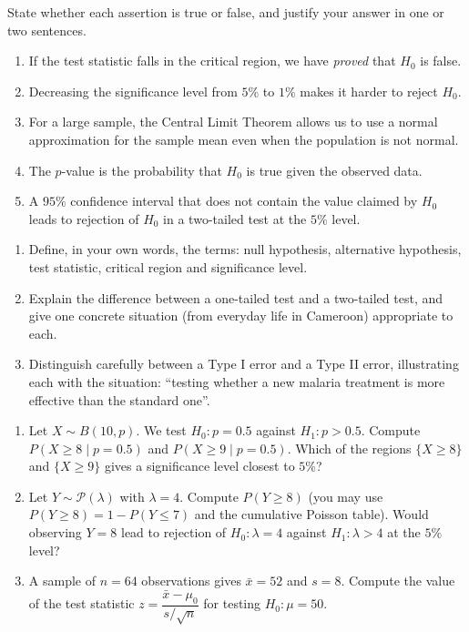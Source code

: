 \documentclass[11pt]{article}
\newcommand{\cle}[1]{{\popxbold\color{popdark}#1}}
\begin{document}
\begin{exercice}
State whether each assertion is true or false, and justify your answer in one or two sentences.
\begin{enumerate}
\item If the test statistic falls in the critical region, we have \emph{proved} that $H_0$ is false.
\item Decreasing the significance level from $5\%$ to $1\%$ makes it harder to reject $H_0$.
\item For a large sample, the Central Limit Theorem allows us to use a normal approximation for the sample mean even when the population is not normal.
\item The $p$-value is the probability that $H_0$ is true given the observed data.
\item A $95\%$ confidence interval that does not contain the value claimed by $H_0$ leads to rejection of $H_0$ in a two-tailed test at the $5\%$ level.
\end{enumerate}
\end{exercice}

\begin{exercice}
\begin{enumerate}
\item Define, in your own words, the terms: \cle{null hypothesis}, \cle{alternative hypothesis}, \cle{test statistic}, \cle{critical region} and \cle{significance level}.
\item Explain the difference between a \cle{one-tailed} test and a \cle{two-tailed} test, and give one concrete situation (from everyday life in Cameroon) appropriate to each.
\item Distinguish carefully between a Type I error and a Type II error, illustrating each with the situation: ``testing whether a new malaria treatment is more effective than the standard one''.
\end{enumerate}
\end{exercice}

\begin{exercice}
\begin{enumerate}
\item Let $X \sim B(10, p)$. We test $H_0: p = 0.5$ against $H_1: p > 0.5$. Compute $P(X \geq 8 \mid p = 0.5)$ and $P(X \geq 9 \mid p = 0.5)$. Which of the regions $\{X \geq 8\}$ and $\{X \geq 9\}$ gives a significance level closest to $5\%$?
\item Let $Y \sim \mathcal{P}(\lambda)$ with $\lambda = 4$. Compute $P(Y \geq 8)$ (you may use $P(Y \geq 8) = 1 - P(Y \leq 7)$ and the cumulative Poisson table). Would observing $Y = 8$ lead to rejection of $H_0: \lambda = 4$ against $H_1: \lambda > 4$ at the $5\%$ level?
\item A sample of $n = 64$ observations gives $\bar{x} = 52$ and $s = 8$. Compute the value of the test statistic $z = \dfrac{\bar{x} - \mu_0}{s/\sqrt{n}}$ for testing $H_0: \mu = 50$.
\end{enumerate}
\end{exercice}
\end{document}
